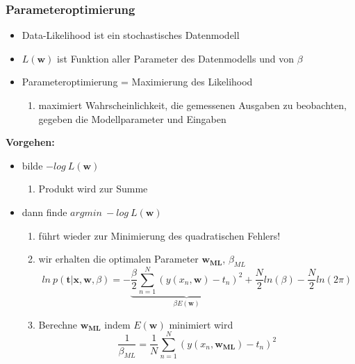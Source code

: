 	\subsubsection{Parameteroptimierung}
	\begin{itemize}
		\item Data-Likelihood ist ein stochastisches Datenmodell
		\item $L(\pmb{w})$ ist Funktion aller Parameter des Datenmodells und von $\beta$
		\item Parameteroptimierung = Maximierung des Likelihood\vspace*{-3pt}
			\begin{enumerate}[$\hookrightarrow$]
			\item maximiert Wahrscheinlichkeit, die gemessenen Ausgaben zu beobachten, gegeben die Modellparameter und Eingaben
		\end{enumerate}
	\end{itemize}
	\textbf{Vorgehen:}
	\begin{itemize}
		\item bilde $-log ~ L(\pmb{w})$\vspace*{-3pt}
		\begin{enumerate}[$\hookrightarrow$]
			\item Produkt wird zur Summe
		\end{enumerate}
		\item dann finde $argmin ~ -log ~ L(\pmb{w})$\vspace*{-3pt}
		\begin{enumerate}[$\hookrightarrow$]
			\item führt wieder zur Minimierung des quadratischen Fehlers!
			\item wir erhalten die optimalen Parameter $\pmb{w_{ML}}$, $\beta_{ML}$
			\begin{equation*}
				ln~ p(\pmb{t} \vert \pmb{x}, \pmb{w}, \beta) = -\underbrace{\frac{\beta}{2}\sum_{n=1}^N(y(x_n, \pmb{w})-t_n)^2}_{\beta E(\pmb{w})} +\frac{N}{2}ln(\beta)-\frac{N}{2}ln(2\pi)
			\end{equation*}
			\item Berechne $\pmb{w_{ML}}$ indem $E(\pmb{w})$ minimiert wird
			\begin{equation*}
				\frac{1}{\beta_{ML}} = \frac{1}{N}\sum_{n=1}^N(y(x_n, \pmb{w_{ML}})-t_n)^2
			\end{equation*}
		\end{enumerate}
	\end{itemize}
